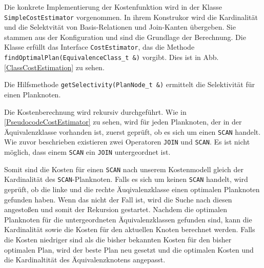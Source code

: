 Die konkrete Implementierung der Kostenfunktion wird in der Klasse \texttt{Simple\-Cost\-Estimator} vorgenommen. In ihrem Konstrukor wird die Kardinalität und die Selektvität von Basis-Relationen und Join-Kanten übergeben. Sie stammen aus der Konfiguration und sind die Grundlage der Berechnung. Die Klasse erfüllt das Interface \texttt{Cost\-Estimator}, das die Methode \texttt{find\-Optimal\-Plan(Equivalence\-Class\_t \&)} vorgibt. Dies ist in Abb. \ref{ClassCostEstimation} zu sehen.

Die Hilfsmethode  \texttt{get\-Selectivity(Plan\-Node\_t \&)} ermittelt die Selektivität für einen Planknoten.


Die Kostenberechnung wird rekursiv durchgeführt. Wie in \ref{PseudocodeCostEstimator} zu sehen, wird für jeden Planknoten, der in der Äquivalenzklasse vorhanden ist, zuerst geprüft, ob es sich um einen \texttt{SCAN} handelt. Wie zuvor beschrieben existieren zwei Operatoren \texttt{JOIN} und \texttt{SCAN}. Es ist nicht möglich, dass einem \texttt{SCAN} ein \texttt{JOIN} untergeordnet ist. 

Somit sind die Kosten für einen \texttt{SCAN} nach unserem Kostenmodell gleich der Kardinalität des \texttt{SCAN}-Planknoten. Falls es sich um keinen \texttt{SCAN} handelt, wird geprüft, ob die linke und die rechte Äuqivalenzklasse einen optimalen Planknoten gefunden haben. Wenn das nicht der Fall ist, wird die Suche nach diesen angestoßen und somit der Rekursion gestartet. Nachdem die optimalen Planknoten für die untergeordneten Äquivalenzklassen gefunden sind, kann die Kardinalität sowie die Kosten für den aktuellen Knoten berechnet werden. Falls die Kosten niedriger sind als die bisher bekannten Kosten für den bisher optimalen Plan, wird der beste Plan neu gesetzt und die optimalen Kosten und die Kardinaltität des Äquivalenzknotens angepasst.



